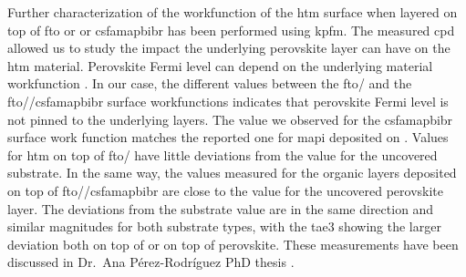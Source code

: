Further characterization of the workfunction of the \gls{htm} surface when layered on top of \gls{fto} or  or \gls{csfamapbibr} has been performed using \gls{kpfm}.
The measured \gls{cpd} allowed us to study the impact the underlying perovskite layer can have on the \gls{htm} material.
Perovskite Fermi level can depend on the underlying material workfunction \cite{Miller2014,Olthof2017}.
In our case, the different values between the \gls{fto}\-/ and the \gls{fto}\-/\-/\gls{csfamapbibr} surface workfunctions indicates that perovskite Fermi level is not pinned to the underlying layers.
The value we observed for the \gls{csfamapbibr} surface work function matches the reported one for \gls{mapi} deposited on  \cite{Miller2014}.
Values for \gls{htm} on top of \gls{fto}\-/ have little deviations from the value for the uncovered substrate.
In the same way, the values measured for the organic layers deposited on top of \gls{fto}\-/\-/\gls{csfamapbibr} are close to the value for the uncovered perovskite layer.
The deviations from the substrate value are in the same direction and similar magnitudes for both substrate types, with the \gls{tae3} showing the larger deviation both on top of  or on top of perovskite.
These measurements have been discussed in Dr.\ Ana Pérez-Rodríguez PhD thesis \cite{Perez-Rodriguez2018}.


